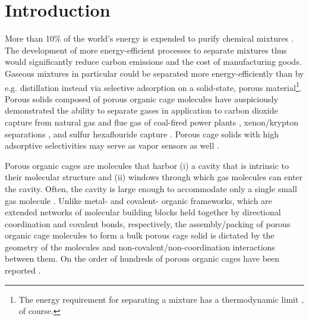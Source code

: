 \documentclass[journal=jacsat,manuscript=article,layout=traditional]{achemso}
\begin{document}
\section{Introduction}
More than 10\% of the world's energy is expended to purify chemical mixtures \cite{sholl2016seven}. The development of more energy-efficient processes to separate mixtures thus would significantly reduce carbon emissions and the cost of manufacturing goods. Gaseous mixtures in particular could be separated more energy-efficiently than by e.g. distillation \cite{doe_study} instead via selective adsorption on a solid-state, porous material\footnote[2]{The energy requirement for separating a mixture has a thermodynamic limit \cite{bhown2011analysis}, of course.}. Porous solids composed of porous organic cage molecules \cite{tozawa2009porous} have auspiciously demonstrated the ability to separate gases \cite{hasell2016porous} in application to carbon dioxide capture from natural gas \cite{mastalerz2011salicylbisimine} and flue gas of coal-fired power plants \cite{tian2009amorphous,hong2015porphyrin}, xenon/krypton separations \cite{chen2014separation,patil2016noria}, and sulfur hexaflouride capture \cite{sf6seps}. Porous cage solids with high adsorptive selectivities may serve as vapor sensors as well \cite{brutschy2012porous,brutschy2013direct}.

Porous organic cages \cite{hasell2016porous,holst2010porous,cooper2017porousacs} are molecules that harbor (i) a cavity that is intrinsic to their molecular structure and (ii) windows through which gas molecules can enter the cavity. Often, the cavity is large enough to accommodate only a single small gas molecule \cite{miklitz2017computational}. Unlike metal- \cite{furukawa2013chemistry} and covalent- \cite{diercks2017atom} organic frameworks, which are extended networks of molecular building blocks held together by directional coordination and covalent bonds, respectively, the assembly/packing of porous organic cage molecules to form a bulk porous cage solid is dictated by the geometry of the molecules and non-covalent/non-coordination interactions between them\cite{mckeown2010nanoporous}. 
On the order of hundreds of porous organic cages have been reported \cite{evans2016computational}.
\end{document}
